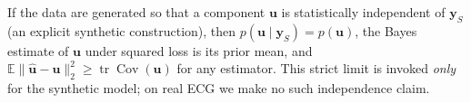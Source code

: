 \begin{propc}
\label{prop:synth}
If the data are generated so that a component $\bm u$ is statistically independent of
$\bm y_S$ (an explicit synthetic construction), then $p(\bm u\mid\bm y_S)=p(\bm u)$, the
Bayes estimate of $\bm u$ under squared loss is its prior mean, and
$\mathbb E\|\widehat{\bm u}-\bm u\|_2^2\ge\operatorname{tr}\operatorname{Cov}(\bm u)$ for any
estimator. This strict limit is invoked \emph{only} for the synthetic model; on real ECG we
make no such independence claim.
\end{propc}
